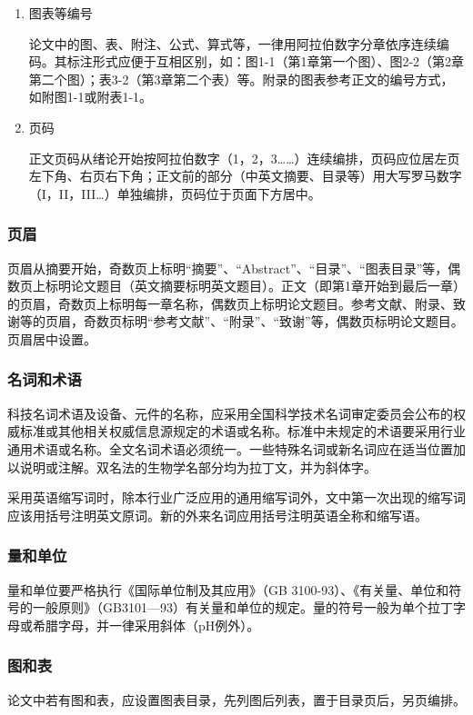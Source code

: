 {\begin{enumerate}
    \item 图表等编号

论文中的图、表、附注、公式、算式等，一律用阿拉伯数字分章依序连续编码。其标注形式应便于互相区别，如：图1-1（第1章第一个图）、图2-2（第2章第二个图）；表3-2（第3章第二个表）等。附录的图表参考正文的编号方式，如附图1-1或附表1-1。

    \item 页码

正文页码从绪论开始按阿拉伯数字（1，2，3……）连续编排，页码应位居左页左下角、右页右下角；正文前的部分（中英文摘要、目录等）用大写罗马数字（I，II，III…）单独编排，页码位于页面下方居中。
\end{enumerate}
\subsubsection{页眉}
页眉从摘要开始，奇数页上标明“摘要”、“Abstract”、“目录”、“图表目录”等，偶数页上标明论文题目（英文摘要标明英文题目）。正文（即第1章开始到最后一章）的页眉，奇数页上标明每一章名称，偶数页上标明论文题目。参考文献、附录、致谢等的页眉，奇数页标明“参考文献”、“附录”、“致谢”等，偶数页标明论文题目。页眉居中设置。

\subsubsection{名词和术语}
科技名词术语及设备、元件的名称，应采用全国科学技术名词审定委员会公布的权威标准或其他相关权威信息源规定的术语或名称。标准中未规定的术语要采用行业通用术语或名称。全文名词术语必须统一。一些特殊名词或新名词应在适当位置加以说明或注解。双名法的生物学名部分均为拉丁文，并为斜体字。

采用英语缩写词时，除本行业广泛应用的通用缩写词外，文中第一次出现的缩写词应该用括号注明英文原词。新的外来名词应用括号注明英语全称和缩写语。

\subsubsection{量和单位}

量和单位要严格执行《国际单位制及其应用》（GB 3100-93）、《有关量、单位和符号的一般原则》（GB3101—93）有关量和单位的规定。量的符号一般为单个拉丁字母或希腊字母，并一律采用斜体（pH例外）。

\subsubsection{图和表}

论文中若有图和表，应设置图表目录，先列图后列表，置于目录页后，另页编排。

}
